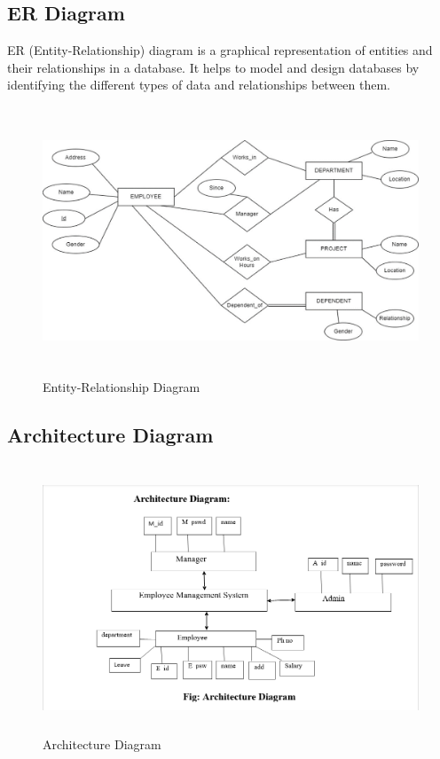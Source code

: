 \subsection{ER Diagram}
ER (Entity-Relationship) diagram is a graphical representation of entities and
their relationships in a database. It helps to model and design databases by
identifying the different types of data and relationships between them.
\begin{figure}[h]
    \centering
    \includegraphics[height=8cm]{img/erdia.png}
    \caption{Entity-Relationship Diagram}
    \label{fig:erdiagram}
\end{figure}
\newpage
\subsection{Architecture Diagram}
\begin{figure}[h]
    \centering
    \includegraphics[height=8cm]{img/artich.png}
    \caption{Architecture Diagram}
    \label{fig:enter-label}
\end{figure}
\newpage
